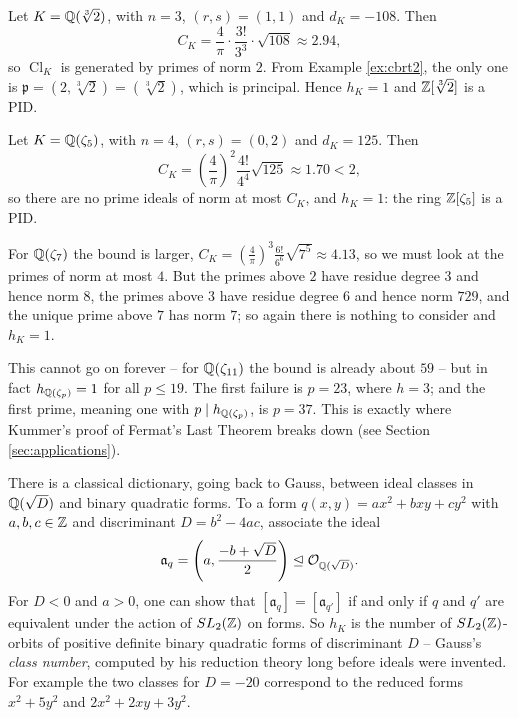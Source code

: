 \documentclass[a4paper]{scrartcl}
\renewcommand{\OO}{\mathcal{O}}
\newcommand{\Cl}{\operatorname{Cl}}
\newcommand{\fa}{\mathfrak{a}}
\newcommand{\fp}{\mathfrak{p}}
\begin{document}
\begin{example}
	Let $K = \mathbb{Q}(\sqrt[3]2)$, with $n = 3$, $(r,s) = (1,1)$ and $d_K = -108$. Then
	$$C_K = \frac4\pi\cdot\frac{3!}{3^3}\cdot\sqrt{108} \approx 2.94,$$
	so $\Cl_K$ is generated by primes of norm $2$. From Example \ref{ex:cbrt2}, the only one is $\fp = (2,\sqrt[3]2) = (\sqrt[3]2)$, which is principal. Hence $h_K = 1$ and $\mathbb{Z}[\sqrt[3]2]$ is a PID.
\end{example}

\begin{example}
	Let $K = \mathbb{Q}(\zeta_5)$, with $n=4$, $(r,s) = (0,2)$ and $d_K = 125$. Then
	$$C_K = \left(\frac4\pi\right)^{\!2}\frac{4!}{4^4}\sqrt{125}\approx 1.70 < 2,$$
	so there are no prime ideals of norm at most $C_K$, and $h_K = 1$: the ring $\mathbb{Z}[\zeta_5]$ is a PID.

	For $\mathbb{Q}(\zeta_7)$ the bound is larger, $C_K = \left(\tfrac4\pi\right)^3\tfrac{6!}{6^6}\sqrt{7^5}\approx4.13$, so we must look at the primes of norm at most $4$. But the primes above $2$ have residue degree $3$ and hence norm $8$, the primes above $3$ have residue degree $6$ and hence norm $729$, and the unique prime above $7$ has norm $7$; so again there is nothing to consider and $h_K = 1$.

	This cannot go on forever -- for $\mathbb{Q}(\zeta_{11})$ the bound is already about $59$ -- but in fact $h_{\mathbb{Q}(\zeta_p)} = 1$ for all $p \le 19$. The first failure is $p = 23$, where $h = 3$; and the first  prime, meaning one with $p \mid h_{\mathbb{Q}(\zeta_p)}$, is $p = 37$. This is exactly where Kummer's proof of Fermat's Last Theorem breaks down (see Section \ref{sec:applications}).
\end{example}

\begin{remark}
	There is a classical dictionary, going back to Gauss, between ideal classes in $\mathbb{Q}(\sqrt D)$ and binary quadratic forms. To a form $q(x,y) = ax^2+bxy+cy^2$ with $a,b,c\in\mathbb{Z}$ and discriminant $D = b^2-4ac$, associate the ideal
	$$\fa_q = \left(a, \frac{-b+\sqrt D}{2}\right) \trianglelefteq \OO_{\Q(\sqrt D)}.$$
	For $D < 0$ and $a > 0$, one can show that $[\fa_q] = [\fa_{q'}]$ if and only if $q$ and $q'$ are equivalent under the action of $SL_2(\mathbb{Z})$ on forms. So $h_K$ is the number of $SL_2(\mathbb{Z})$-orbits of positive definite binary quadratic forms of discriminant $D$ -- Gauss's \emph{class number}, computed by his reduction theory long before ideals were invented. For example the two classes for $D = -20$ correspond to the reduced forms $x^2+5y^2$ and $2x^2+2xy+3y^2$.
\end{remark}
\end{document}

